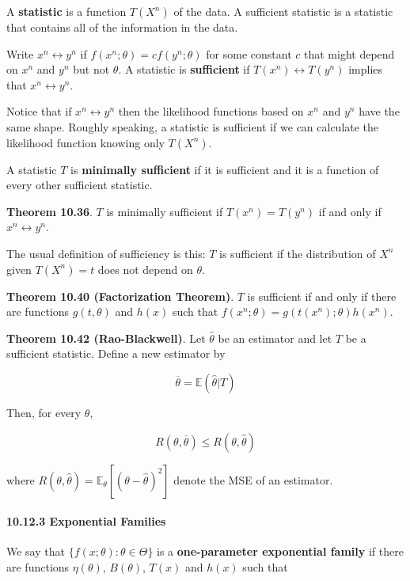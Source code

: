 A \textbf{statistic} is a function \(T(X^n)\) of the data. A sufficient
statistic is a statistic that contains all of the information in the
data.

Write \(x^n \leftrightarrow y^n\) if
\(f(x^n; \theta) = c f(y^n; \theta)\) for some constant \(c\) that might
depend on \(x^n\) and \(y^n\) but not \(\theta\). A statistic is
\textbf{sufficient} if \(T(x^n) \leftrightarrow T(y^n)\) implies that
\(x^n \leftrightarrow y^n\).

Notice that if \(x^n \leftrightarrow y^n\) then the likelihood functions
based on \(x^n\) and \(y^n\) have the same shape. Roughly speaking, a
statistic is sufficient if we can calculate the likelihood function
knowing only \(T(X^n)\).

A statistic \(T\) is \textbf{minimally sufficient} if it is sufficient
and it is a function of every other sufficient statistic.

\textbf{Theorem 10.36}. \(T\) is minimally sufficient if
\(T(x^n) = T(y^n)\) if and only if \(x^n \leftrightarrow y^n\).

The usual definition of sufficiency is this: \(T\) is sufficient if the
distribution of \(X^n\) given \(T(X^n) = t\) does not depend on
\(\theta\).

\textbf{Theorem 10.40 (Factorization Theorem)}. \(T\) is sufficient if
and only if there are functions \(g(t, \theta)\) and \(h(x)\) such that
\(f(x^n; \theta) = g(t(x^n); \theta)h(x^n)\).

\textbf{Theorem 10.42 (Rao-Blackwell)}. Let \(\hat{\theta}\) be an
estimator and let \(T\) be a sufficient statistic. Define a new
estimator by

\[\overline{\theta} = \mathbb{E}(\hat{\theta} | T)\]

Then, for every \(\theta\),

\[R(\theta, \overline{\theta}) \leq R(\theta, \hat{\theta})\]

where
\(R(\theta, \hat{\theta}) = \mathbb{E}_\theta[(\theta - \hat{\theta})^2]\)
denote the MSE of an estimator.

\paragraph{10.12.3 Exponential Families}\label{exponential-families}

We say that \(\{f(x; \theta) : \theta \in \Theta\}\) is a
\textbf{one-parameter exponential family} if there are functions
\(\eta(\theta)\), \(B(\theta)\), \(T(x)\) and \(h(x)\) such that

